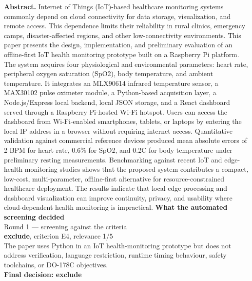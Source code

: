 \documentclass[11pt,a4paper]{article}
\begin{document}
{\small\textbf{Abstract.} Internet of Things (IoT)-based healthcare monitoring systems commonly depend on cloud connectivity for data storage, visualization, and remote access. This dependence limits their reliability in rural clinics, emergency camps, disaster-affected regions, and other low-connectivity environments. This paper presents the design, implementation, and preliminary evaluation of an offline-first IoT health monitoring prototype built on a Raspberry Pi platform. The system acquires four physiological and environmental parameters: heart rate, peripheral oxygen saturation (SpO2), body temperature, and ambient temperature. It integrates an MLX90614 infrared temperature sensor, a MAX30102 pulse oximeter module, a Python-based acquisition layer, a Node.js/Express local backend, local JSON storage, and a React dashboard served through a Raspberry Pi-hosted Wi-Fi hotspot. Users can access the dashboard from Wi-Fi-enabled smartphones, tablets, or laptops by entering the local IP address in a browser without requiring internet access. Quantitative validation against commercial reference devices produced mean absolute errors of 2 BPM for heart rate, 0.6\% for SpO2, and 0.2C for body temperature under preliminary resting measurements. Benchmarking against recent IoT and edge-health monitoring studies shows that the proposed system contributes a compact, low-cost, multi-parameter, offline-first alternative for resource-constrained healthcare deployment. The results indicate that local edge processing and dashboard visualization can improve continuity, privacy, and usability where cloud-dependent health monitoring is impractical.}
\vspace{3mm}
\vspace{2.5mm}
{\small\textbf{What the automated screening decided}}\\[2mm]
{\footnotesize\color{soft}Round 1 --- screening against the criteria}\\[0.5mm]
{\small\textbf{exclude}, criterion E4, relevance 1/5}\\[0.5mm]
{\small The paper uses Python in an IoT health-monitoring prototype but does not address verification, language restriction, runtime timing behaviour, safety toolchains, or DO-178C objectives.}\\[2.5mm]
{\small\textbf{Final decision: exclude}}
\vspace{2mm}
\end{document}
